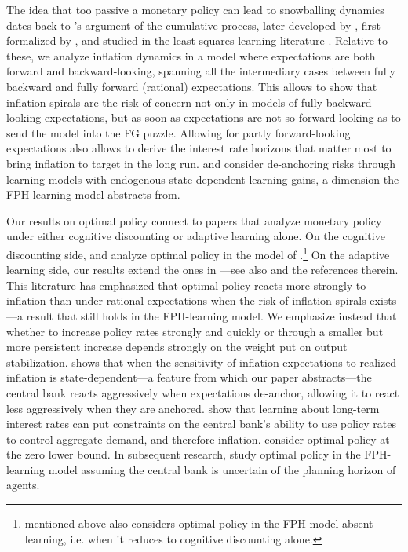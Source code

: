 \documentclass{article}
\begin{document}
The idea that too passive a monetary policy can lead to snowballing dynamics dates back to \cite{Wicksell}'s argument of the cumulative process, later developed by \cite{Friedman1968}, first formalized by \cite{Howitt1992}, and studied in the least squares learning literature \citep[e.g.][]{BullardMitra2002, EvansHonkapohja2003, Preston2005}. Relative to these, we analyze inflation dynamics in a model where expectations are both forward and backward-looking, spanning all the intermediary cases between fully backward and fully forward (rational) expectations. This allows to show that inflation spirals are the risk of concern not only in models of fully backward-looking expectations, but as soon as expectations are not so forward-looking as to send the model into the FG puzzle. Allowing for partly forward-looking expectations also allows to derive the interest rate horizons that matter most to bring inflation to target in the long run. \cite{Carvalhoetal2023} and \cite{Gati2022} consider de-anchoring risks through learning models with endogenous state-dependent learning gains, a dimension the FPH-learning model abstracts from.

Our results on optimal policy connect to papers that analyze monetary policy under either cognitive discounting or adaptive learning alone. On the cognitive discounting side, \cite{Nakataetal2019} and \cite{BenchimolBounader2023} analyze optimal policy in the model of \cite{Gabaix2020}.\footnote{\cite{WoodfordXie2020} mentioned above also considers optimal policy in the FPH model absent learning, i.e. when it reduces to cognitive discounting alone.} On the adaptive learning side, our results extend the ones in \cite{MolnarSantoro2014}---see also \cite{EusepiPrestonJEL,GasparSmetsVestin2010,Eusepietal_pricestability} and the references therein. This literature has emphasized that optimal policy reacts more strongly to inflation than under rational expectations when the risk of inflation spirals exists---a result that still holds in the FPH-learning model. We emphasize instead that whether to increase policy rates strongly and quickly or through a smaller but more persistent increase depends strongly on the weight put on output stabilization. \cite{Gati2022} shows that when the sensitivity of inflation expectations to realized inflation is state-dependent---a feature from which our paper abstracts---the central bank reacts aggressively when expectations de-anchor, allowing it to react less aggressively when they are anchored. \cite{Eusepietal_limits} show that learning about long-term interest rates can put constraints on the central bank's ability to use policy rates to control aggregate demand, and therefore inflation. \cite{Eusepietal_ZLB} consider optimal policy at the zero lower bound. In subsequent research, \cite{GustLopezSalido2025} study optimal policy in the FPH-learning model assuming the central bank is uncertain of the planning horizon of agents.
\end{document}

